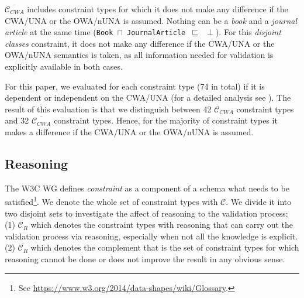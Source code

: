 \documentclass{llncs}
\newcommand{\ms}[1]{\texttt{#1}}
\begin{document}
$\overline{\mathcal{C}_{CWA}}$ includes constraint types for which it does not make any difference if the CWA/UNA or the OWA/nUNA is assumed.
 Nothing can be a \emph{book} and a \emph{journal article}  at the same time (\ms{Book $\sqcap$ JournalArticle $\sqsubseteq$ $\perp$}).
For this {\em disjoint classes} constraint, it does not make any difference if the CWA/UNA or the OWA/nUNA semantics is taken,
as all information needed for validation is explicitly available in both cases. 

For this paper, we evaluated for each constraint type (74 in total) if it is dependent or independent on the CWA/UNA (for a detailed analysis see \cite{BoschNolleAcarEckert2015}). 
The result of this evaluation is that we distinguish between 42 $\mathcal{C}_{CWA}$ constraint types and 32 $\overline{\mathcal{C}_{CWA}}$ constraint types.
Hence, for the majority of constraint types it makes a difference if the CWA/UNA or the OWA/nUNA is assumed.

\subsection{Reasoning}



The W3C WG defines \emph{constraint} as a component of a schema what needs to be satisfied\footnote{See \url{https://www.w3.org/2014/data-shapes/wiki/Glossary}.}. 
We denote the whole set of constraint types with $\mathcal{C}$. We divide it into two disjoint sets  to investigate the affect of reasoning to the validation process; (1) $\mathcal{C}_R$ which denotes the constraint types with reasoning that can carry out the validation process via reasoning, especially when not all the knowledge is explicit.  
(2) $\overline{\mathcal{C}_{R}}$  which denotes the complement that is the set of constraint types for which reasoning cannot be done or does not improve the result in any obvious sense.
\end{document}
